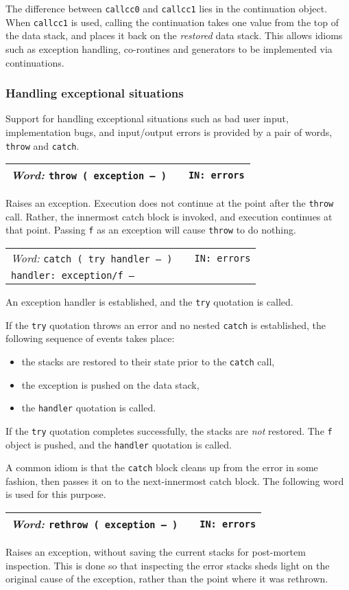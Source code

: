 \documentclass{report}
\newcommand{\ordinaryword}[3]{\index{#1}
\emph{Word:} \texttt{#2} &&\texttt{IN: #3}}
\newcommand{\wordtable}[1]{

\begin{tabularx}{12cm}[t]{lXr}
\hline
#1\\
\hline
\end{tabularx}

}
\begin{document}
The difference between \texttt{callcc0} and \texttt{callcc1} lies in the continuation object. When \texttt{callcc1} is used, calling the continuation takes one value from the top of the data stack, and places it back on the \emph{restored} data stack. This allows idioms such as exception handling, co-routines and generators to be implemented via continuations.

\subsubsection{\label{exceptions}Handling exceptional situations}

Support for handling exceptional situations such as bad user input, implementation bugs, and input/output errors is provided by a pair of words, \texttt{throw} and \texttt{catch}.

\wordtable{
\ordinaryword{throw}{throw ( exception -- )}{errors}
}
Raises an exception. Execution does not continue at the point after the \texttt{throw} call. Rather, the innermost catch block is invoked, and execution continues at that point. Passing \texttt{f} as an exception will cause \texttt{throw} to do nothing.
\wordtable{
\ordinaryword{catch}{catch ( try handler -- )}{errors}\\
\texttt{handler:~exception/f -- }
}
An exception handler is established, and the \texttt{try} quotation is called.

If the \texttt{try} quotation throws an error and no nested \texttt{catch} is established, the following sequence of events takes place:
\begin{itemize}
\item the stacks are restored to their state prior to the \texttt{catch} call,
\item the exception is pushed on the data stack,
\item the \texttt{handler} quotation is called.
\end{itemize}
If the \texttt{try} quotation completes successfully, the stacks are \emph{not} restored. The \texttt{f} object is pushed, and the \texttt{handler} quotation is called.

A common idiom is that the \texttt{catch} block cleans up from the error in some fashion, then passes it on to the next-innermost catch block. The following word is used for this purpose.
\wordtable{
\ordinaryword{rethrow}{rethrow ( exception -- )}{errors}
}
Raises an exception, without saving the current stacks for post-mortem inspection. This is done so that inspecting the error stacks sheds light on the original cause of the exception, rather than the point where it was rethrown.
\end{document}

